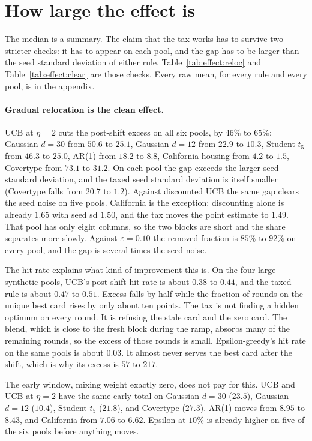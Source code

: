 \documentclass[11pt]{article}
\begin{document}
\section{How large the effect is}

The median is a summary. The claim that the tax works has to survive two stricter checks: it has to appear on each pool, and the gap has to be larger than the seed standard deviation of either rule. Table~\ref{tab:effect:reloc} and Table~\ref{tab:effect:clear} are those checks. Every raw mean, for every rule and every pool, is in the appendix.

\paragraph{Gradual relocation is the clean effect.}
UCB at \(\eta=2\) cuts the post-shift excess on all six pools, by \(46\%\) to \(65\%\):
Gaussian \(d=30\) from \(50.6\) to \(25.1\),
Gaussian \(d=12\) from \(22.9\) to \(10.3\),
Student-\(t_5\) from \(46.3\) to \(25.0\),
AR(1) from \(18.2\) to \(8.8\),
California housing from \(4.2\) to \(1.5\),
Covertype from \(73.1\) to \(31.2\).
On each pool the gap exceeds the larger seed standard deviation, and the taxed seed standard deviation is itself smaller (Covertype falls from \(20.7\) to \(1.2\)).
Against discounted UCB the same gap clears the seed noise on five pools.
California is the exception: discounting alone is already \(1.65\) with seed sd \(1.50\), and the tax moves the point estimate to \(1.49\).
That pool has only eight columns, so the two blocks are short and the share separates more slowly.
Against \(\varepsilon=0.10\) the removed fraction is \(85\%\) to \(92\%\) on every pool, and the gap is several times the seed noise.

The hit rate explains what kind of improvement this is.
On the four large synthetic pools, UCB's post-shift hit rate is about \(0.38\) to \(0.44\), and the taxed rule is about \(0.47\) to \(0.51\).
Excess falls by half while the fraction of rounds on the unique best card rises by only about ten points.
The tax is not finding a hidden optimum on every round.
It is refusing the stale card and the zero card.
The blend, which is close to the fresh block during the ramp, absorbs many of the remaining rounds, so the excess of those rounds is small.
Epsilon-greedy's hit rate on the same pools is about \(0.03\).
It almost never serves the best card after the shift, which is why its excess is \(57\) to \(217\).

The early window, mixing weight exactly zero, does not pay for this.
UCB and UCB at \(\eta=2\) have the same early total on Gaussian \(d=30\) (\(23.5\)), Gaussian \(d=12\) (\(10.4\)), Student-\(t_5\) (\(21.8\)), and Covertype (\(27.3\)).
AR(1) moves from \(8.95\) to \(8.43\), and California from \(7.06\) to \(6.62\).
Epsilon at \(10\%\) is already higher on five of the six pools before anything moves.
\end{document}
